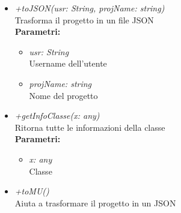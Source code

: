\begin{itemize}
\begin{itemize}
    		\item \emph{+toJSON(usr: String, projName: string)}\\
    		Trasforma il progetto in un file JSON\\
    		\textbf{Parametri:}
    		\begin{itemize}
    			\item \emph{usr: String}\\
    			Username dell'utente
    			\item \emph{projName: string}\\
    			Nome del progetto
    		\end{itemize}
    		\item \emph{+getInfoClasse(x: any)}\\
    		Ritorna tutte le informazioni della classe\\
    		\textbf{Parametri:}
    		\begin{itemize}
    			\item \emph{x: any}\\
    			Classe
    		\end{itemize}
    		\item \emph{+toMU()}\\
    		Aiuta a trasformare il progetto in un JSON
		\end{itemize}
\end{itemize}